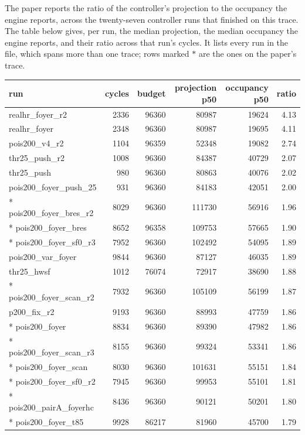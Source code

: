 \documentclass[10pt]{article}
\begin{document}
The paper reports the ratio of the controller's projection to the occupancy the
engine reports, across the twenty-seven controller runs that finished on this
trace. The table below gives, per run, the median projection, the median
occupancy the engine reports, and their ratio across that run's cycles. It lists
every run in the file, which spans more than one trace; rows marked $\ast$ are
the ones on the paper's trace.
\begin{center}\footnotesize\setlength{\tabcolsep}{4pt}
\begin{tabular}{lrrrrr}
\toprule
run & cycles & budget & projection p50 & occupancy p50 & ratio \\
\midrule
realhr\_foyer\_r2 & 2336 & 96360 & 80987 & 19624 & 4.13 \\
realhr\_foyer & 2348 & 96360 & 80987 & 19695 & 4.11 \\
pois200\_v4\_r2 & 1104 & 96359 & 52348 & 19082 & 2.74 \\
thr25\_push\_r2 & 1008 & 96360 & 84387 & 40729 & 2.07 \\
thr25\_push & 980 & 96360 & 80863 & 40076 & 2.02 \\
pois200\_foyer\_push\_25 & 931 & 96360 & 84183 & 42051 & 2.00 \\
* pois200\_foyer\_bres\_r2 & 8029 & 96360 & 111730 & 56916 & 1.96 \\
* pois200\_foyer\_bres & 8652 & 96358 & 109753 & 57665 & 1.90 \\
* pois200\_foyer\_sf0\_r3 & 7952 & 96360 & 102492 & 54095 & 1.89 \\
pois200\_var\_foyer & 9844 & 96360 & 87127 & 46035 & 1.89 \\
thr25\_hwsf & 1012 & 76074 & 72917 & 38690 & 1.88 \\
* pois200\_foyer\_scan\_r2 & 7932 & 96360 & 105109 & 56199 & 1.87 \\
p200\_fix\_r2 & 9193 & 96360 & 88993 & 47759 & 1.86 \\
* pois200\_foyer & 8834 & 96360 & 89390 & 47982 & 1.86 \\
* pois200\_foyer\_scan\_r3 & 8155 & 96360 & 99324 & 53341 & 1.86 \\
* pois200\_foyer\_scan & 8030 & 96360 & 101631 & 55151 & 1.84 \\
* pois200\_foyer\_sf0\_r2 & 7945 & 96360 & 99953 & 55101 & 1.81 \\
* pois200\_pairA\_foyerhc & 8436 & 96360 & 90121 & 50201 & 1.80 \\
* pois200\_foyer\_t85 & 9928 & 86217 & 81960 & 45700 & 1.79 \\

\end{tabular}
\end{center}
\end{document}
